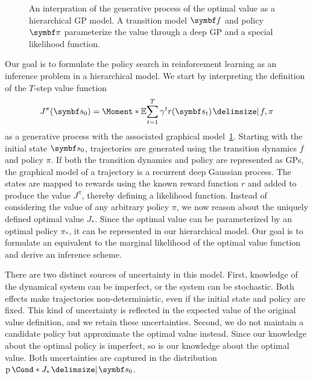 \begin{figure}[t]
    \centering
    
    \caption[Graphical model: Policy search as a hierarchical GP]{
        \label{fig:mountaincar:graphical_model}
        An interpration of the generative process of the optimal value as a hierarchical GP model.
        A transition model $\mat{f}$ and policy $\mat{\pi}$ parameterize the value through a deep GP and a special likelihood function.
    }
\end{figure}
Our goal is to formulate the policy search in reinforcement learning as an inference problem in a hierarchical model.
We start by interpreting the definition of the $T$-step value function
\begin{align}
    J^\pi(\mat{s}_0) = \Moment*{\E}{\sum_{t=1}^T \gamma^t r(\mat{s}_t) \given f, \pi}
\end{align}
as a generative process with the associated graphical model~\cref{fig:mountaincar:graphical_model}.
Starting with the initial state $\mat{s}_0$, trajectories are generated using the transition dynamics $f$ and policy $\pi$.
If both the transition dynamics and policy are represented as GPs, the graphical model of a trajectory is a recurrent deep Gaussian process.
The states are mapped to rewards using the known reward function $r$ and added to produce the value $J^\pi$, thereby defining a likelihood function.
Instead of considering the value of any arbitrary policy $\pi$, we now reason about the uniquely defined optimal value $J_\ast$.
Since the optimal value can be parameterized by an optimal policy $\pi_\ast$, it can be represented in our hierarchical model.
Our goal is to formulate an equivalent to the marginal likelihood of the optimal value function and derive an inference scheme.

There are two distinct sources of uncertainty in this model.
First, knowledge of the dynamical system can be imperfect, or the system can be stochastic.
Both effects make trajectories non-deterministic, even if the initial state and policy are fixed.
This kind of uncertainty is reflected in the expected value of the original value definition, and we retain these uncertainties.
Second, we do not maintain a candidate policy but approximate the optimal value instead.
Since our knowledge about the optimal policy is imperfect, so is our knowledge about the optimal value.
Both uncertainties are captured in the distribution $\Prob*{J_\ast \given \mat{s}_0}$.

